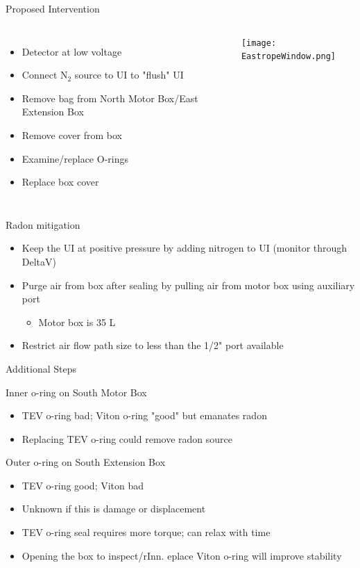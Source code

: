\documentclass{beamer}
\begin{document}
\begin{frame}{Proposed Intervention}
\begin{columns}
\begin{itemize}
\item Detector at low voltage
\item Connect N$_{2}$ source to UI to "flush" UI
\item Remove bag from North Motor Box/East Extension Box
\item Remove cover from box
\item Examine/replace O-rings 
\item Replace box cover
\end{itemize}
\texttt{[image: EastropeWindow.png]}
\end{columns}
\vspace{-0.5cm}
\begin{block}{Radon mitigation}
\begin{itemize}
\item Keep the UI at positive pressure by adding nitrogen to UI (monitor through DeltaV)
\item Purge air from box after sealing by pulling air from motor box using auxiliary port
	\begin{itemize}
	\item Motor box is 35 L 
	\end{itemize}
\item Restrict air flow path size to less than the 1/2" port available
\end{itemize}
\end{block}

\end{frame}

\begin{frame}{Additional Steps}
	\begin{block}{Inner o-ring on South Motor Box}
		\begin{itemize}
		\item TEV o-ring bad; Viton o-ring "good" but emanates radon
		\item Replacing TEV o-ring could remove radon source
		\end{itemize}
	\end{block}
	\begin{block}{Outer o-ring on South Extension Box}
		\begin{itemize}
		\item TEV o-ring good; Viton bad 
		\item Unknown if this is damage or displacement
		\item TEV o-ring seal requires more torque; can relax with time
		\item Opening the box to inspect/rInn.
		eplace Viton o-ring will improve stability
		\end{itemize}
	\end{block}
\end{frame}
\end{document}
